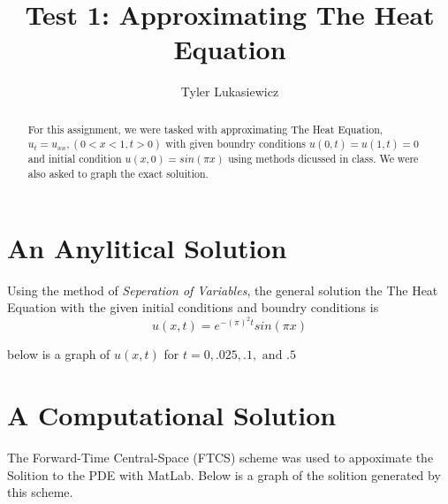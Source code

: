 \documentclass{article}
\author{Tyler Lukasiewicz}
\title{Test 1: Approximating The Heat Equation}
\begin{document}
\maketitle
  \begin{abstract}
      For this assignment, we were tasked with approximating The Heat Equation, $u_t = u_{xx}, (0<x<1, t > 0)$ with given boundry conditions $u(0,t) = u(1,t) = 0$ and initial condition $u(x,0) = sin(\pi x)$ using methods dicussed in class. We were also asked to graph the exact soluition. 
 \end{abstract}
 \section{An Anylitical Solution}
    Using the method of \textit{Seperation of Variables}, the general solution the The Heat Equation with the given initial conditions and boundry conditions is
    \begin{equation}
        u(x,t) = e^{-(\pi)^2 t}sin(\pi x)
   \end{equation}

   below is a graph of $u(x,t)$ for $t = 0, .025, .1,\text{ and } .5$
   \section{A Computational Solution}
    The Forward-Time Central-Space (FTCS) scheme was used to appoximate the Solition to the PDE with MatLab. Below is a graph of the solition generated by this scheme. 
   \label{sec:A Computational Solution}




 \label{sec:An Anylitical Solution}
\end{document}
